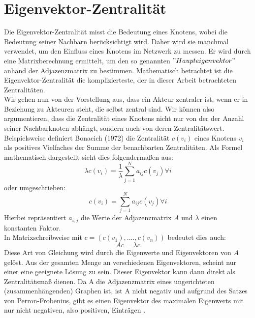\section{Eigenvektor-Zentralität}
Die Eigenvektor-Zentralität misst die Bedeutung eines Knotens, wobei die Bedeutung seiner Nachbarn berücksichtigt wird. Daher wird sie manchmal verwendet, um den Einfluss eines Knotens im Netzwerk zu messen. Er wird durch eine Matrixberechnung ermittelt, um den so genannten $"Haupteigenvektor"$ anhand der Adjazenzmatrix zu bestimmen. Mathematisch betrachtet ist die Eigenvektor-Zentralität die komplizierteste, der in dieser Arbeit betrachteten Zentralitäten.\\
Wir gehen nun von der Vorstellung aus, dass ein Akteur zentraler ist, wenn er in Beziehung zu Akteuren steht, die selbst zentral sind. Wir können also argumentieren, dass die Zentralität eines Knotens nicht nur von der der Anzahl seiner Nachbarknoten abhängt, sondern auch von deren Zentralitätswert. Beispielsweise definiert Bonacich (1972) die Zentralität $c(v_i)$ eines Knotens $v_i$ als positives Vielfaches der Summe der benachbarten Zentralitäten. Als Formel mathematisch dargestellt sieht dies folgendermaßen aus:
\begin{equation}
     \lambda c(v_i) = \frac{1}{\lambda} \sum_{j=1}^{N}a_{ij}c(v_j) \forall i
\end{equation} oder umgeschrieben:  
\begin{equation}
     c(v_i) = \sum_{j=1}^{N}a_{ij}c(v_j) \forall i
\end{equation}
Hierbei repräsentiert $a_{i,j}$ die Werte der Adjazenzmatrix $A$ und $\lambda$ einen konstanten Faktor. \\
In Matrixschreibweise mit $c = (c(v_1), ...., c(v_n))$ bedeutet dies auch:
\begin{equation}
     Ac = \lambda c
\end{equation}
Diese Art von Gleichung wird durch die Eigenwerte und Eigenvektoren von $A$ gelöst.
Aus der gesamten Menge an verschiedenen Eigenvektoren, scheint nur einer eine geeignete Lösung zu sein. 
Dieser Eigenvektor kann dann direkt als Zentralitätsmaß dienen. Da A die Adjazenzmatrix eines ungerichteten (zusammenhängenden) Graphen ist, ist A nicht negativ und aufgrund des Satzes von Perron-Frobenius, gibt es einen Eigenvektor des maximalen Eigenwerts mit nur nicht negativen, also positiven, Einträgen \cite{brittaRuhnau}.

